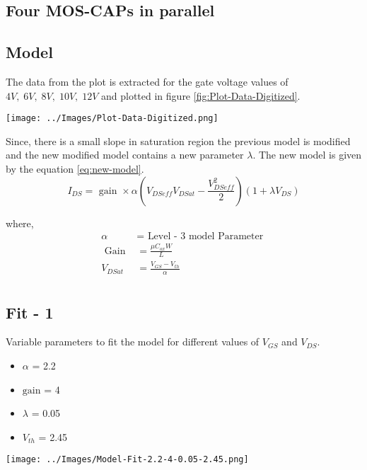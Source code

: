 \documentclass{article}
\begin{document}
\newpage

\subsection{Four MOS-CAPs in parallel}

\subsection{Model}
The data from the plot is extracted for the gate voltage values of 
\newline$4V, \; 6V, \;  8V, \; 10V, \; 12V$  and plotted in figure \ref{fig:Plot-Data-Digitized}.
\begin{center}
    \label{fig:Plot-Data-Digitized}
    \texttt{[image: ../Images/Plot-Data-Digitized.png]}
\end{center}
Since, there is a small slope in saturation region the previous model is modified and the new modified model contains a new parameter $\lambda$. 
The new model is given by the equation \ref{eq:new-model}. 
\begin{equation}
    \label{eq:new-model}
    \boxed{I_{DS} =  \text{ gain } \times \alpha (V_{DSeff}V_{DSat} - \frac{V_{DSeff}^2}{2})(1+\lambda V_{DS})  }
\end{equation}

where, 
\begin{align}
    \alpha &= \text{ Level - 3 model Parameter } \\
    \text { Gain } &= \frac{\mu C_{ox} W }{L}\\
    V_{DSat} &= \frac{V_{GS} - V_{th}}{\alpha} \\
\end{align}
\newpage
\subsection{Fit - 1}
Variable parameters to fit the model for different values of $V_{GS}$ and $V_{DS}$. 
\begin{itemize}
    \item $\alpha$ = 2.2
    \item $\text{gain}$ = 4
    \item $\lambda$ = 0.05
    \item $V_{th}$ = 2.45
\end{itemize}
\begin{center}
    \label{fig:model-fit-1}
    \texttt{[image: ../Images/Model-Fit-2.2-4-0.05-2.45.png]}
\end{center}
\newpage
\end{document}
